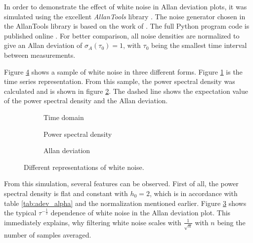 In order to demonstrate the effect of white noise in Allan deviation plots, it was simulated using the excellent \textit{AllanTools} library \cite{allantools}. The noise generator chosen in the AllanTools library is based on the work of \citeauthor{noise_generation} \cite{noise_generation}. The full Python program code is published online \cite{}. For better comparison, all noise densities are normalized to give an Allan deviation of $\sigma_A(\tau_0)=1$, with $\tau_0$ being the smallest time interval between measurements.

Figure \ref{fig:white_noise_simulated} shows a sample of white noise in three different forms. Figure \ref{fig:white_noise_time} is the time series representation. From this sample, the power spectral density was calculated and is shown in figure \ref{fig:white_noise_psd}. The dashed line shows the expectation value of the power spectral density and the Allan deviation.

\begin{figure}[ht]
    \centering
    \begin{subfigure}{0.32\linewidth}
        \centering
        \scalebox{0.75}{%
            
        } %
        \caption{Time domain}
        \label{fig:white_noise_time}
    \end{subfigure}
    \hfill
    \begin{subfigure}{0.32\linewidth}
        \centering
        \scalebox{0.75}{%
            
        } %
        \caption{Power spectral density}
        \label{fig:white_noise_psd}
    \end{subfigure}
    \hfill
    \begin{subfigure}{0.32\linewidth}
        \centering
        \scalebox{0.75}{%
            
        } %
        \caption{Allan deviation}
        \label{fig:white_noise_adev}
    \end{subfigure}
    \caption{Different representations of white noise.}
    \label{fig:white_noise_simulated}
\end{figure}

From this simulation, several features can be observed. First of all, the power spectral density is flat and constant with $h_0 = 2$, which is in accordance with table \ref{tab:adev_alpha} and the normalization mentioned earlier. Figure \ref{fig:white_noise_adev} shows the typical $\tau^{-\frac 1 2}$ dependence of white noise in the Allan deviation plot. This immediately explains, why filtering white noise scales with $\frac{1}{\sqrt{n}}$ with $n$ being the number of samples averaged.

